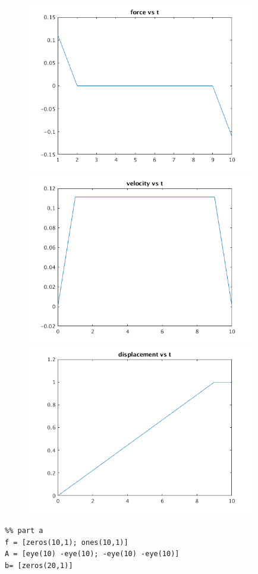 \documentclass[12pt,letter]{article}
\begin{document}
\begin{enumerate}
\begin{enumerate}
    \begin{figure}[H]
    \centering
    \includegraphics[width=10cm]{q7/q7_a_1.png}
    \includegraphics[width=10cm]{q7/q7_a_2.png}
    \includegraphics[width=10cm]{q7/q7_a_3.png}
  \end{figure}

\begin{verbatim}
%% part a
f = [zeros(10,1); ones(10,1)]
A = [eye(10) -eye(10); -eye(10) -eye(10)]
b= [zeros(20,1)]


\end{verbatim}
\end{enumerate}
\end{enumerate}
\end{document}
